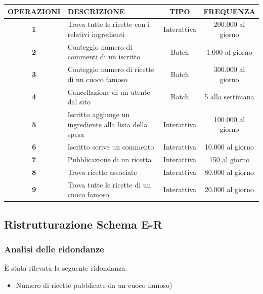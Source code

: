 \documentclass[12pt]{extarticle}
\begin{document}
\vspace{0.5cm}
    \begin{tabularx}{\textwidth}{c|X|c|c}
    \bfseries OPERAZIONI    & \bfseries DESCRIZIONE     & \bfseries TIPO & \bfseries FREQUENZA\\ 
    \hline\hline
    \bfseries 1     & Trova tutte le ricette con i relativi ingredienti         & Interattiva       &   200.000 al giorno    \\ 
    \hline
    \bfseries 2     & Conteggio numero di commenti di un iscritto               & Batch             &   1.000 al giorno \\
    \hline
    \bfseries 3     & Conteggio numero di ricette di un cuoco famoso            & Batch       &   300.000 al giorno \\
    \hline
    \bfseries 4     & Cancellazione di un utente dal sito                       & Batch           &   5 alla settimana \\
    \hline
    \bfseries 5     & Iscritto aggiunge un ingrediente alla lista della spesa   & Interattiva        &   100.000 al giorno \\
    \hline
    \bfseries 6     & Iscritto scrive un commento                               & Interattiva     &   10.000 al giorno \\
    \hline
    \bfseries 7     & Pubblicazione di un ricetta                               & Interattiva         &   150 al giorno \\
    \hline
    \bfseries 8     & Trova ricette associate                                   & Interattiva       &   80.000 al giorno\\
    \hline
    \bfseries 9     & Trova tutte le ricette di un cuoco famoso                 & Interattiva             &   20.000 al giorno\\
    \hline
    \end{tabularx}


\subsection{Ristrutturazione Schema E-R}
\subsubsection{Analisi delle ridondanze}
È stata rilevata la seguente ridondanza:
\begin{itemize}
    \item Numero di ricette pubblicate da un cuoco famoso)
\end{itemize}
\end{document}

